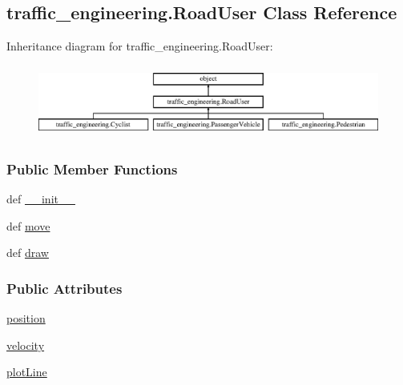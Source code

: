 \hypertarget{classtraffic__engineering_1_1RoadUser}{\subsection{traffic\-\_\-engineering.\-Road\-User Class Reference}
\label{classtraffic__engineering_1_1RoadUser}
}
Inheritance diagram for traffic\-\_\-engineering.\-Road\-User\-:\begin{figure}[H]
\begin{center}
\leavevmode
\includegraphics[height=2.393162cm]{classtraffic__engineering_1_1RoadUser}
\end{center}
\end{figure}
\subsubsection*{Public Member Functions}
\begin{DoxyCompactItemize}
\item 
def \hyperlink{classtraffic__engineering_1_1RoadUser_ac36b20a593f7b32fbe043386a696187e}{\-\_\-\-\_\-init\-\_\-\-\_\-}
\item 
def \hyperlink{classtraffic__engineering_1_1RoadUser_ad014cc731ad56b53b33405eb2128884f}{move}
\item 
def \hyperlink{classtraffic__engineering_1_1RoadUser_a3b39e080c58dba1b8bc6b0124a9d702e}{draw}
\end{DoxyCompactItemize}
\subsubsection*{Public Attributes}
\begin{DoxyCompactItemize}
\item 
\hyperlink{classtraffic__engineering_1_1RoadUser_a92811b712640b70ead2464b7fffdd542}{position}
\item 
\hyperlink{classtraffic__engineering_1_1RoadUser_a7079a72070f9195666285a3f421fc971}{velocity}
\item 
\hyperlink{classtraffic__engineering_1_1RoadUser_a288af60f7c5503d632fac5a6fe1ba95f}{plot\-Line}
\end{DoxyCompactItemize}


